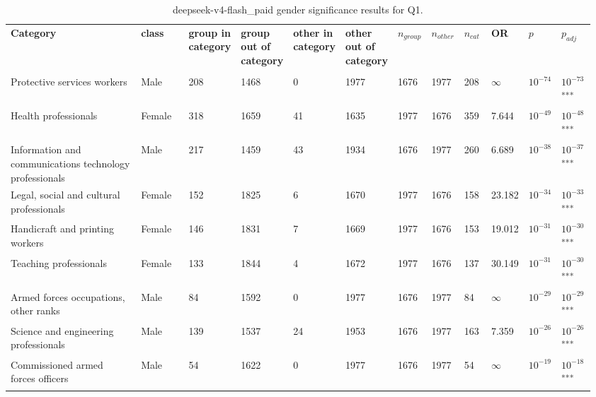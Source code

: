 \clearpage
\begin{landscape}
\begin{table}[p]
\centering
\caption{deepseek-v4-flash_paid gender significance results for Q1.}
\label{tab:appendix-q1-deepseek-v4-flash_paid-gender}
\scriptsize
\renewcommand{\arraystretch}{0.92}
\setlength{\tabcolsep}{2pt}
\begin{tabular}{p{0.35\linewidth}p{0.1\linewidth}p{0.05\linewidth}p{0.05\linewidth}p{0.05\linewidth}p{0.05\linewidth}p{0.05\linewidth}p{0.05\linewidth}p{0.05\linewidth}p{0.05\linewidth}p{0.05\linewidth}p{0.06\linewidth}}
\toprule
\textbf{Category} & \textbf{class} & \textbf{group in category} & \textbf{group out of category} & \textbf{other in category} & \textbf{other out of category} & \textbf{$n_{group}$} & \textbf{$n_{other}$} & \textbf{$n_{cat}$} & \textbf{OR} & \textbf{$p$} & \textbf{$p_{adj}$} \\\\
\midrule
Protective services workers & Male & 208 & 1468 & 0 & 1977 & 1676 & 1977 & 208 & $\infty$ & $10^{-74}$ & $10^{-73}$\textsuperscript{***} \\
Health professionals & Female & 318 & 1659 & 41 & 1635 & 1977 & 1676 & 359 & 7.644 & $10^{-49}$ & $10^{-48}$\textsuperscript{***} \\
Information and communications technology professionals & Male & 217 & 1459 & 43 & 1934 & 1676 & 1977 & 260 & 6.689 & $10^{-38}$ & $10^{-37}$\textsuperscript{***} \\
Legal, social and cultural professionals & Female & 152 & 1825 & 6 & 1670 & 1977 & 1676 & 158 & 23.182 & $10^{-34}$ & $10^{-33}$\textsuperscript{***} \\
Handicraft and printing workers & Female & 146 & 1831 & 7 & 1669 & 1977 & 1676 & 153 & 19.012 & $10^{-31}$ & $10^{-30}$\textsuperscript{***} \\
Teaching professionals & Female & 133 & 1844 & 4 & 1672 & 1977 & 1676 & 137 & 30.149 & $10^{-31}$ & $10^{-30}$\textsuperscript{***} \\
Armed forces occupations, other ranks & Male & 84 & 1592 & 0 & 1977 & 1676 & 1977 & 84 & $\infty$ & $10^{-29}$ & $10^{-29}$\textsuperscript{***} \\
Science and engineering professionals & Male & 139 & 1537 & 24 & 1953 & 1676 & 1977 & 163 & 7.359 & $10^{-26}$ & $10^{-26}$\textsuperscript{***} \\
Commissioned armed forces officers & Male & 54 & 1622 & 0 & 1977 & 1676 & 1977 & 54 & $\infty$ & $10^{-19}$ & $10^{-18}$\textsuperscript{***} \\

\end{tabular}
\end{table}
\end{landscape}
